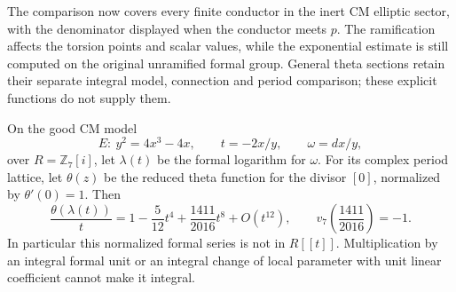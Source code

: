 The comparison now covers every finite conductor in the inert
CM elliptic sector, with the denominator displayed when the
conductor meets $p$. The ramification affects the torsion points
and scalar values, while the exponential estimate is still
computed on the original unramified formal group. General theta
sections retain their separate integral model, connection and
period comparison; these explicit functions do not supply them.

\begin{proposition}
On the good CM model
\[
 E:\ y^2=4x^3-4x,\qquad t=-2x/y,\qquad\omega=dx/y,
\]
over $R=\mathbb Z_7[i]$, let $\lambda(t)$ be the formal logarithm
for $\omega$. For its complex period lattice, let $\theta(z)$
be the reduced theta function for the divisor $[0]$, normalized
by $\theta'(0)=1$. Then
\begin{equation}\label{eq:ag-theta-nonintegral}
 \frac{\theta(\lambda(t))}{t}
   =1-\frac5{12}t^4+\frac{1411}{2016}t^8+O(t^{12}),
 \qquad v_7\left(\frac{1411}{2016}\right)=-1.
\end{equation}
In particular this normalized formal series is not in $R[[t]]$.
Multiplication by an integral formal unit or an integral change
of local parameter with unit linear coefficient cannot make it
integral.
\end{proposition}
